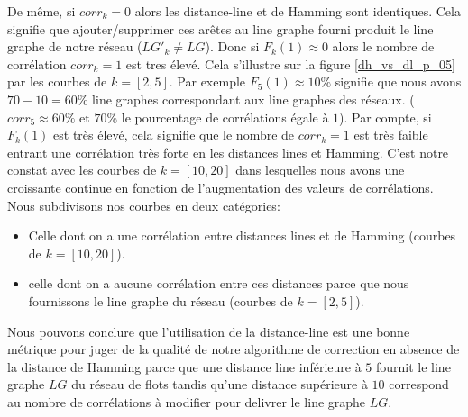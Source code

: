 \documentclass[onecolumn, 12pt]{book}
\begin{document}
De m\^eme, si $corr_k = 0$ alors les distance-line et de Hamming sont identiques. Cela signifie que ajouter/supprimer ces ar\^etes au line graphe fourni produit le line graphe de notre r\'eseau ($LG'_{k} \neq LG$).
\newline
Donc si $F_k(1) \approx 0$ alors le nombre de corr\'elation $corr_k = 1$ est tres \'elev\'e. Cela s'illustre sur la figure \ref{dh_vs_dl_p_05} par les courbes de $k=[2,5]$. 
Par exemple $F_5(1) \approx 10\%$ signifie que nous avons $70-10=60\%$ line graphes correspondant aux line graphes des r\'eseaux. ($corr_5 \approx 60\%$ et $70\%$ le pourcentage de corr\'elations \'egale \`a $1$).
\newline
Par compte, si  $F_k(1)$ est tr\`es \'elev\'e, cela signifie que le nombre de $corr_k = 1$ est tr\`es faible entrant une corr\'elation tr\`es forte en les distances lines et Hamming.
C'est notre constat avec les courbes de $k = [10,20]$ dans lesquelles nous avons une  croissante continue en fonction de l'augmentation des valeurs de corr\'elations.
\newline
Nous subdivisons nos courbes en deux cat\'egories:
\begin{itemize}
	\item Celle dont on a une corr\'elation entre distances lines et de Hamming (courbes de $k = [10,20]$).
	\item celle dont on a aucune corr\'elation entre ces distances parce que nous fournissons le line graphe du r\'eseau (courbes de $k = [2,5]$). 
\end{itemize}
Nous pouvons conclure que l'utilisation de la distance-line est une bonne m\'etrique pour juger de la qualit\'e de notre algorithme de correction en absence de la distance de Hamming parce que une distance line inf\'erieure \`a $5$ fournit le line graphe $LG$ du r\'eseau de flots tandis qu'une distance sup\'erieure \`a $10$ correspond au nombre de corr\'elations \`a modifier pour delivrer le line graphe $LG$. 
\end{document}
